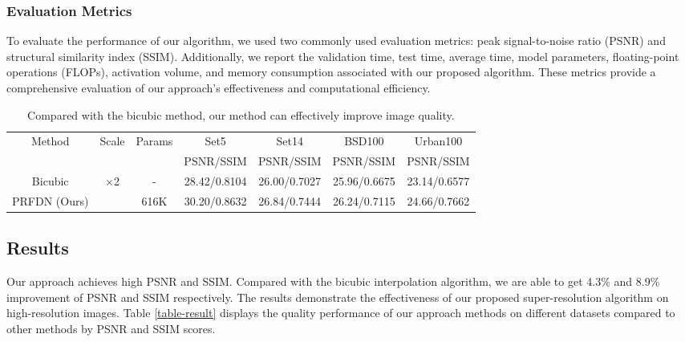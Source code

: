 \documentclass[10pt,twocolumn,letterpaper]{article}
\begin{document}
\subsubsection{Evaluation Metrics}
To evaluate the performance of our algorithm, we used two commonly used evaluation metrics: peak signal-to-noise ratio (PSNR) and structural similarity index (SSIM). Additionally, we report the validation time, test time, average time, model parameters, floating-point operations (FLOPs), activation volume, and memory consumption associated with our proposed algorithm. These metrics provide a comprehensive evaluation of our approach's effectiveness and computational efficiency.
\begin{table}[t]
  \centering
  \caption{Results of our computational efficiency on DIV2K dataset.}
  \label{tab-runtime}
\end{table}

\begin{table}[t]
    \caption{Compared with the bicubic method, our method can effectively improve image quality.}
    \resizebox{\columnwidth}{!}
    {
        \begin{tabular}{|c|c|c|c|c|c|c|}
        \hline
        \multirow{2}{*}{Method} & \multirow{2}{*}{Scale} & \multirow{2}{*}{Params} & Set5  & Set14 & BSD100 & Urban100  \\
    \cline{4-7}          &       &       & PSNR/SSIM & PSNR/SSIM & PSNR/SSIM & PSNR/SSIM  \\
        \hline
        Bicubic & \multirow{2}[2]{*}{×2} & -     & 28.42/0.8104 & 26.00/0.7027 & 25.96/0.6675 & 23.14/0.6577  \\
        PRFDN (Ours) &       & 616K  & 30.20/0.8632 & 26.84/0.7444 & 26.24/0.7115 & 24.66/0.7662 \\
        \hline
        \end{tabular}%
    }
    \label{tab-quality}
\end{table}%
\subsection{Results}
Our approach achieves high PSNR and SSIM. Compared with the bicubic interpolation algorithm, we are able to get 4.3\% and 8.9\% improvement of PSNR and SSIM respectively. The results demonstrate the effectiveness of our proposed super-resolution algorithm on high-resolution images. Table \ref{table-result} displays the quality performance of our approach methods on different datasets compared to other methods by PSNR and SSIM scores.
\end{document}
